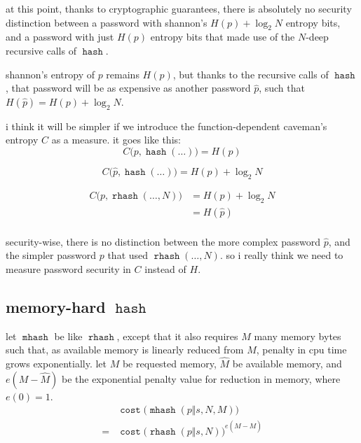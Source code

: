 \documentclass[twocolumn]{article}
\DeclareMathOperator{\hash}{\mathtt{hash}}
\DeclareMathOperator{\rhash}{\mathtt{rhash}}
\DeclareMathOperator{\mhash}{\mathtt{mhash}}
\DeclareMathOperator{\cost}{\mathtt{cost}}
\begin{document}
at this point, thanks to cryptographic guarantees, there is absolutely no
security distinction between a password with shannon's $H(p) + \log_2 N$
entropy bits, and a password with just $H(p)$ entropy bits that made use of
the $N$-deep recursive calls of $\hash$.

shannon's entropy of $p$ remains $H(p)$, but thanks to the recursive calls
of $\hash$, that password will be as expensive as another password $\hat
p$, such that $H(\hat p) = H(p) + \log_2 N$.

i think it will be simpler if we introduce the function-dependent caveman's
entropy $C$ as a measure.  it goes like this:
\begin{equation}
    C\Big(p, \hash(\ldots)\Big) = H(p)
\end{equation}

\begin{equation}
    C\Big(\hat p, \hash(\ldots)\Big) = H(p) + \log_2 N
\end{equation}

\begin{equation}
    \begin{split}
        C\Big(p, \rhash(\ldots, N)\Big) &= H(p) + \log_2 N \\
                                &= H(\hat p) \\
    \end{split}
\end{equation}

security-wise, there is no distinction between the more complex password
$\hat p$, and the simpler password $p$ that used $\rhash(\ldots, N)$.  so i
really think we need to measure password security in $C$ instead of $H$.

\subsection{memory-hard $\hash$}
let $\mhash$ be like $\rhash$, except that it also requires $M$ many memory
bytes such that, as available memory is linearly reduced from $M$, penalty
in cpu time grows exponentially.  let $M$ be requested memory, $\hat M$ be
available memory, and $e(M - \hat M)$ be the exponential penalty value for
reduction in memory, where $e(0) = 1$.
\begin{equation}
    \begin{split}
        & \cost\Big(\mhash(p \Vert s, N, M)\Big) \\
    ={} & \cost\Big(\rhash(p \Vert s, N)\Big)^{e(\hat M - M)}
    \end{split}
\end{equation}
\end{document}
